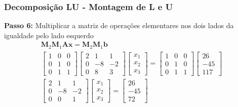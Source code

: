 \documentclass{beamer}
\theoremstyle{mystyle}
\begin{document}
\begin{frame}
	\frametitle{Decomposição LU - Montagem de L e U}
	\textbf{Passo 6:} Multiplicar a matriz de operações elementares nos dois lados da igualdade pelo lado esquerdo
	\begin{gather*}
		\mathbf{M}_{2}\mathbf{M}_{1}\mathbf{Ax} = \mathbf{M}_{2}\mathbf{M}_{1}\mathbf{b}\\
		\left[
		\begin{array}{ccc}
			1 & 0 & 0  \\
			0 & 1 & 0  \\
			0 & 1 & 1
		\end{array}
		\right]
		\left[
		\begin{array}{ccc}
			2 & 1 & 1  \\
			0 & -8 & -2  \\
			0 & 8 & 3
		\end{array}
		\right] 
		\begin{bmatrix} x_{1} \\ x_{2} \\ x_{3} \end{bmatrix}
		=
		\left[
		\begin{array}{ccc}
			1 & 0 & 0  \\
			0 & 1 & 0  \\
			0 & 1 & 1
		\end{array}
		\right]
		\begin{bmatrix} 26 \\ -45 \\ 117 \end{bmatrix}\\
		\left[
		\begin{array}{ccc}
			2 & 1 & 1  \\
			0 & -8 & -2  \\
			0 & 0 & 1
		\end{array}
		\right] 
		\begin{bmatrix} x_{1} \\ x_{2} \\ x_{3} \end{bmatrix}
		=
		\begin{bmatrix} 26 \\ -45 \\ 72 \end{bmatrix}
	\end{gather*}
\end{frame}
\end{document}

